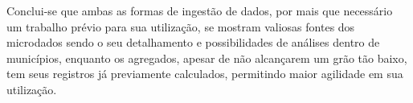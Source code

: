 Conclui-se que ambas as formas de ingestão de dados, por mais que necessário um trabalho prévio para sua utilização, se mostram valiosas fontes dos microdados sendo o seu detalhamento e possibilidades de análises dentro de municípios, enquanto os agregados, apesar de não alcançarem um grão tão baixo, tem seus registros já previamente calculados, permitindo maior agilidade em sua utilização.


